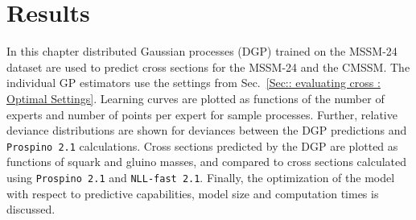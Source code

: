 \documentclass[twoside,english]{uiofysmaster}
\begin{document}
{{%



\chapter{Results}\label{Chapter:Results}

In this chapter distributed Gaussian processes (DGP) trained on the MSSM-24 dataset are used to predict cross sections for the MSSM-24 and the CMSSM. The individual GP estimators use the settings from Sec.~\ref{Sec:: evaluating cross : Optimal Settings}. Learning curves are plotted as functions of the number of experts and number of points per expert for sample processes. Further, relative deviance distributions are shown for deviances between the DGP predictions and \verb|Prospino 2.1| calculations. Cross sections predicted by the DGP are plotted as functions of squark and gluino masses, and compared to cross sections calculated using \verb|Prospino 2.1| and \verb|NLL-fast 2.1|. Finally, the optimization of the model with respect to predictive capabilities, model size and computation times is discussed.

}}
\end{document}
